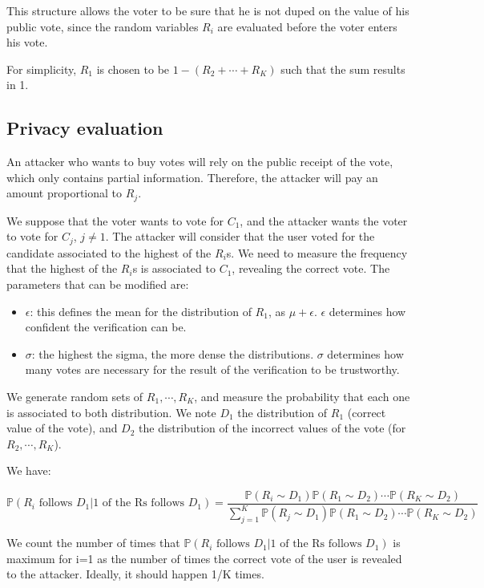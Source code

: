 \documentclass{article}
\begin{document}
\bigbreak

This structure allows the voter to be sure that he is not duped on the value of his public vote, since the random variables $R_i$ are evaluated before the voter enters his vote.

\bigbreak

For simplicity, $R_1$ is chosen to be $1-(R_2+\cdots+R_K)$ such that the sum results in 1.


\subsection{Privacy evaluation}

An attacker who wants to buy votes will rely on the public receipt of the vote, which only contains partial information. Therefore, the attacker will pay an amount proportional to $R_j$.

We suppose that the voter wants to vote for $C_1$, and the attacker wants the voter to vote for $C_j$, $j\neq 1$. The attacker will consider that the user voted for the candidate associated to the highest of the $R_i$s. We need to measure the frequency that the highest of the $R_i$s is associated to $C_1$, revealing the correct vote. The parameters that can be modified are:
\begin{itemize}
    \item $\epsilon$: this defines the mean for the distribution of $R_1$, as $\mu + \epsilon$. $\epsilon$ determines how confident the verification can be.
    \item $\sigma$: the highest the sigma, the more dense the distributions. $\sigma$ determines how many votes are necessary for the result of the verification to be trustworthy.
\end{itemize}

We generate random sets of $R_1, \cdots, R_K$, and measure the probability that each one is associated to both distribution. We note $D_1$ the distribution of $R_1$ (correct value of the vote), and $D_2$ the distribution of the incorrect values of the vote (for $R_2, \cdots, R_K$).

We have:

$\mathbb{P}(R_i\text{ follows }D_1 | \text{1 of the Rs follows }D_1)=\dfrac{\mathbb{P}(R_i\sim D_1)\mathbb{P}(R_1 \sim D_2)\cdots \mathbb{P}(R_K \sim D_2)}{\sum\limits_{j=1}^{K}\mathbb{P}(R_j\sim D_1)\mathbb{P}(R_1 \sim D_2)\cdots \mathbb{P}(R_K \sim D_2)}$

We count the number of times that $\mathbb{P}(R_i\text{ follows }D_1 | \text{1 of the Rs follows }D_1)$ is maximum for i=1 as the number of times the correct vote of the user is revealed to the attacker. Ideally, it should happen 1/K times.
\end{document}
